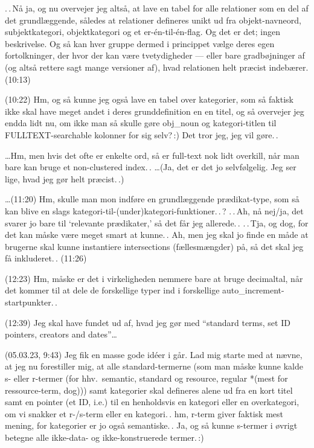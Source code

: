 \documentclass{report}
\begin{document}
.\,.\,Nå ja, og nu overvejer jeg altså, at lave en tabel for alle relationer som en del af det grundlæggende, således at relationer defineres unikt ud fra objekt-navneord, subjektkategori, objektkategori og et er-én-til-én-flag. Og det er det; ingen beskrivelse. Og så kan hver gruppe dermed i princippet vælge deres egen fortolkninger, der hvor der kan være tvetydigheder --- eller bare gradbøjninger af (og altså rettere sagt mange versioner af), hvad relationen helt præcist indebærer. (10:13)

(10:22) Hm, og så kunne jeg også lave en tabel over kategorier, som så faktisk ikke skal have meget andet i deres grunddefinition en en titel, og så overvejer jeg endda lidt nu, om ikke man så skulle gøre obj\_noun og kategori-titlen til FULLTEXT-searchable kolonner for sig selv?\,:) Det tror jeg, jeg vil gøre.\,. 

\ldots Hm, men hvis det ofte er enkelte ord, så er full-text nok lidt overkill, når man bare kan bruge et non-clustered index.\,. \ldots (Ja, det er det jo selvfølgelig. Jeg ser lige, hvad jeg gør helt præcist.\,.)

\ldots (11:20) Hm, skulle man mon indføre en grundlæggende prædikat-type, som så kan blive en slags kategori-til-(under)kategori-funktioner.\,.\,? .\,.\,Ah, nå nej/ja, det svarer jo bare til `relevante prædikater,' så det får jeg allerede.\,. .\,.\,Tja, og dog, for det kan måske være meget smart at kunne.\,. Ah, men jeg skal jo finde en måde at brugerne skal kunne instantiere intersections (fællesmængder) på, så det skal jeg få inkluderet.\,. (11:26)

(12:23) Hm, måske er det i virkeligheden nemmere bare at bruge decimaltal, når det kommer til at dele de forskellige typer ind i forskellige auto\_increment-startpunkter.\,. 

(12:39) Jeg skal have fundet ud af, hvad jeg gør med ``standard terms, set ID pointers, creators and dates''\ldots 


(05.03.23, 9:43) Jeg fik en masse gode idéer i går. Lad mig starte med at nævne, at jeg nu forestiller mig, at alle standard-termerne (som man måske kunne kalde s- eller r-termer (for hhv.\ semantic, standard og resource, regular *(mest for ressource-term, dog))) samt kategorier skal defineres alene ud fra en kort titel samt en pointer (et ID, i.e.) til en henholdsvis en kategori eller en overkategori, om vi snakker et r-/s-term eller en kategori.\,. hm, r-term giver faktisk mest mening, for kategorier er jo også semantiske.\,. Ja, og så kunne s-termer i øvrigt betegne alle ikke-data- og ikke-konstruerede termer.\,:) 
\end{document}
